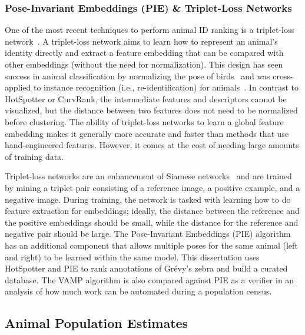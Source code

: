 \subsubsection{Pose-Invariant Embeddings (PIE) \& Triplet-Loss Networks}

One of the most recent techniques to perform animal ID ranking is a triplet-loss network~\cite{dong_triplet_2018,hermans_defense_2017,schroff_facenet_2015}.  A triplet-loss network aims to learn how to represent an animal's identity directly and extract a feature embedding that can be compared with other embeddings (without the need for normalization).  This design has seen success in animal classification by normalizing the pose of birds~\cite{branson_bird_2014} and was cross-applied to instance recognition (i.e., re-identification) for animals~\cite{schneider_similarity_2020,nepovinnykh_siamese_2020,dlamini_automated_2020}.  In contrast to HotSpotter or CurvRank, the intermediate features and descriptors cannot be visualized, but the distance between two features does not need to be normalized before clustering.  The ability of triplet-loss networks to learn a global feature embedding makes it generally more accurate and faster than methods that use hand-engineered features.  However, it comes at the cost of needing large amounts of training data.

Triplet-loss networks are an enhancement of Siamese networks~\cite{melekhov_siamese_2016,varior_gated_2016,varior_siamese_2016} and are trained by mining a triplet pair consisting of a reference image, a positive example, and a negative image.  During training, the network is tasked with learning how to do feature extraction for embeddings; ideally, the distance between the reference and the positive embeddings should be small, while the distance for the reference and negative pair should be large.  The Pose-Invariant Embeddings (PIE) algorithm ~\cite{moskvyak_robust_2019} has an additional component that allows multiple poses for the same animal (left and right) to be learned within the same model.  This dissertation uses HotSpotter and PIE to rank annotations of Gr\'evy's zebra and build a curated database. The VAMP algorithm is also compared against PIE as a verifier in an analysis of how much work can be automated during a population census.

\subsection{Animal Population Estimates}

